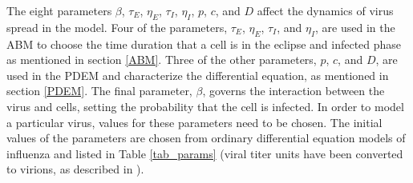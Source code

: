 The eight parameters $\beta$, $\tau_E$, $\eta_E$, $\tau_I$, $\eta_I$, $p$, $c$, and $D$ affect the dynamics of virus spread in the model. Four of the parameters, $\tau_E$, $\eta_E$, $\tau_I$, and $\eta_I$, are used in the ABM to choose the time duration that a cell is in the eclipse and infected phase as mentioned in section \ref{ABM}. Three of the other parameters, $p$, $c$, and $D$, are used in the PDEM and characterize the differential equation, as mentioned in section \ref{PDEM}. The final parameter, $\beta$, governs the interaction between the virus and cells, setting the probability that the cell is infected. In order to model a particular virus, values for these parameters need to be chosen. The initial values of the parameters are chosen from ordinary differential equation models of influenza and listed in Table \ref{tab_params} (viral titer units have been converted to virions, as described in \citep{dobrovolny17}). %

\begin{table}
\caption{Parameter values to simulate an influenza infection with the ABM/PDEM model.\label{tab_params}}
\end{table}

